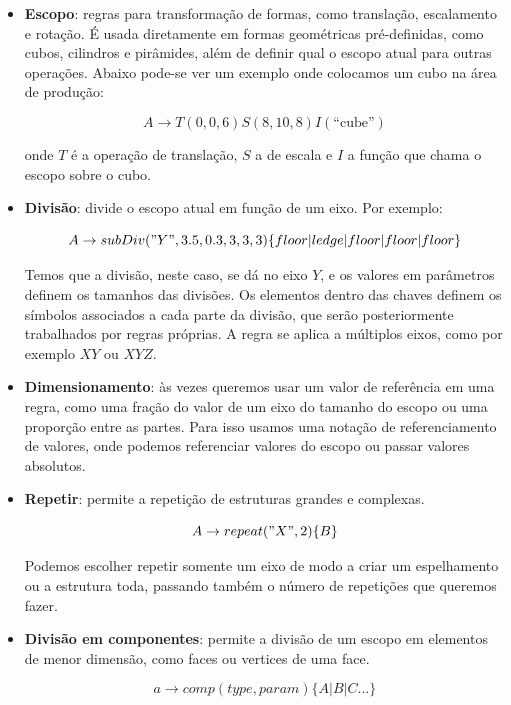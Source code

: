 \documentclass[a4paper, 11pt]{article}
\begin{document}
    \begin{itemize}
        \item \textbf{Escopo}: regras para transformação de formas, como translação, escalamento e rotação. É usada diretamente em formas geométricas pré-definidas, como cubos, cilindros e pirâmides, além de definir qual o escopo atual para outras operações. Abaixo pode-se ver um exemplo onde colocamos um cubo na área de produção:

        $$A \rightarrow T(0,0,6) S(8,10,8) I(\text{``cube''})$$

        onde $T$ é a operação de translação, $S$ a de escala e $I$ a função que chama o escopo sobre o cubo.

        \item \textbf{Divisão}: divide o escopo atual em função de um eixo. Por exemplo:

        $$A \rightarrow subDiv("Y",3.5,0.3,3,3,3)\{floor|ledge|floor|floor|floor\}$$

        Temos que a divisão, neste caso, se dá no eixo $Y$, e os valores em parâmetros definem os tamanhos das divisões. Os elementos dentro das chaves definem os símbolos associados a cada parte da divisão, que serão posteriormente trabalhados por regras próprias. A regra se aplica a múltiplos eixos, como por exemplo $XY$ ou $XYZ$.

        \item \textbf{Dimensionamento}: às vezes queremos usar um valor de referência em uma regra, como uma fração do valor de um eixo do tamanho do escopo ou uma proporção entre as partes. Para isso usamos uma notação de referenciamento de valores, onde podemos referenciar valores do escopo ou passar valores absolutos.

        \item \textbf{Repetir}: permite a repetição de estruturas grandes e complexas.

        $$A \rightarrow repeat("X",2)\{B\}$$

        Podemos escolher repetir somente um eixo de modo a criar um espelhamento ou a estrutura toda, passando também o número de repetições que queremos fazer.

        \item \textbf{Divisão em componentes}: permite a divisão de um escopo em elementos de menor dimensão, como faces ou vertices de uma face.

        $$a \rightarrow comp(type, param)\{A|B|C...\}$$
    \end{itemize}
\end{document}
